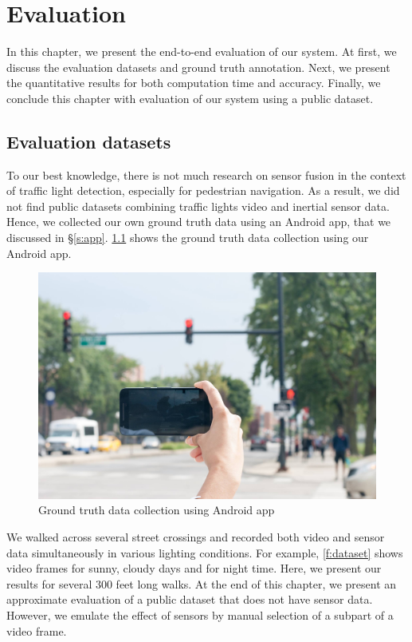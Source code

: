 \chapter{Evaluation}
\label{c:evalu}

In this chapter, we present the end-to-end evaluation of our system.
At first, we discuss the evaluation datasets and ground truth annotation.
Next, we present the quantitative results for both computation time and accuracy.
Finally, we conclude this chapter with evaluation of our system using a public dataset.

\section{Evaluation datasets}
\label{s:eval}
To our best knowledge, there is not much research on sensor fusion in the context of traffic light detection, especially for pedestrian navigation. 
As a result, we did not find public datasets combining traffic lights video and inertial sensor data. 
Hence, we collected our own ground truth data using an Android app, that we discussed in \S\ref{s:app}.
\ref{f:ground_truth} shows the ground truth data collection using our Android app.

\begin{figure}[!ht]
\centering
\includegraphics[width=5.2in]{images/ground_truth.jpg}
\caption{Ground truth data collection using Android app}
\label{f:ground_truth}
\end{figure}

We walked across several street crossings and recorded both video and sensor data simultaneously in various lighting conditions. 
For example, \ref{f:dataset} shows video frames for sunny, cloudy days and for night time. 
Here, we present our results for several 300 feet long walks.  
At the end of this chapter, we present an approximate evaluation of a public dataset that does not have sensor data. 
However, we emulate the effect of sensors by manual selection of a subpart of a video frame. 

